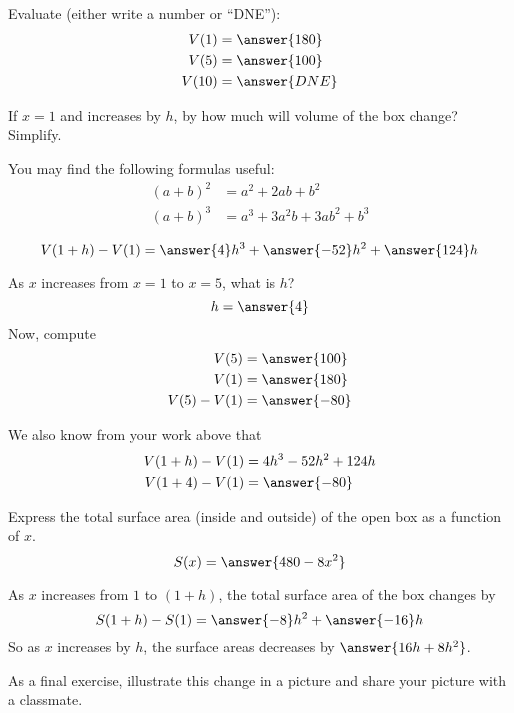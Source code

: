 \documentclass{ximera}
\begin{document}
\begin{exercise}
  Evaluate (either write a number or ``DNE''):
  \begin{align*}
    V(1) &= \answer{180}\\
    V(5) &= \answer{100}\\
    V(10) &= \answer{DNE}
  \end{align*}
\end{exercise}
\begin{exercise}
  If $x = 1$ and increases by $h$, by how much will volume of the box change? Simplify.
  \begin{hint}
    You may find the following formulas useful:
    \begin{align*}
      (a+b)^2 &= a^2 + 2ab + b^2\\
      (a + b)^3 &= a^3 + 3 a^2 b + 3 ab^2 + b^3
    \end{align*}
  \end{hint}
  \[
  V(1+h) - V(1) = \answer{4}h^3 +\answer{-52}h^2 + \answer{124}h
  \]
\end{exercise}

\begin{exercise}
  As $x$ increases from $x=1$ to $x=5$, what is $h$?
  \[
  h=\answer{4}
  \]
  Now, compute
  \begin{align*}
    V(5) &= \answer{100}\\
    V(1) &= \answer{180}\\
    V(5) - V(1) &= \answer{-80}
  \end{align*}
  \begin{exercise}
    We also know from your work above that
    \begin{align*}
      V(1+h) -V(1) &= 4h^3 -52h^2 + 124h\\
      V(1+4) - V(1) &= \answer{-80}
    \end{align*}
  \end{exercise}
\end{exercise}

\begin{exercise}
  Express the total surface area (inside and outside) of the open box
  as a function of $x$.
  \[
  S(x) = \answer{480-8x^2}
  \]
\end{exercise}
\begin{exercise}
  As $x$ increases from $1$ to $(1+h)$, the total surface area of the
  box changes by
  \[
  S(1+h) - S(1) = \answer{-8}h^2 + \answer{-16}h
  \]
  So as $x$ increases by $h$, the surface areas decreases by
  $\answer{16h+8h^2}$.

  As a final exercise, illustrate this change in a picture and share your picture with a classmate.
  \begin{multipleChoice}
  \end{multipleChoice}
\end{exercise}
\end{document}

